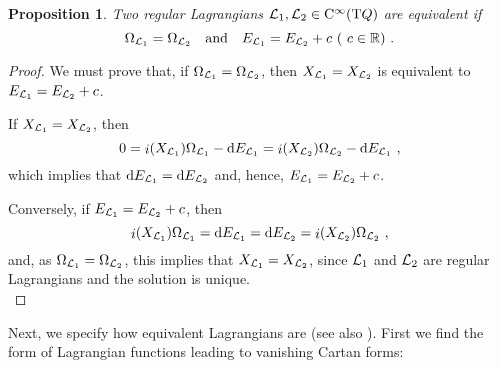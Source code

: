 \documentclass[12pt]{report}
\newtheorem{prop}[teor]{Proposition}
\def\qed{\ifvmode\removelastskip\fi
{\unskip\nobreak\hfil\penalty50\hbox{}\nobreak\hfil
\hbox{\vrule height1.2ex width1.2ex}\parfillskip=0pt
\finalhyphendemerits=0 \par\smallskip}}
\def\Lag{{\cal L}}
\def\d{{\rm d}}
\def\Real{\mathbb{R}}
\def\Tan{{\rm T}}
\def\inn{\mathop{i}\nolimits}
\def\Cinfty{{\rm C}^\infty}
\begin{document}
\begin{prop}
Two regular Lagrangians $\Lag_1,\Lag_2\in\Cinfty (\Tan Q)$
are equivalent if
$$
\Omega_{\Lag_1}=\Omega_{\Lag_2}
\quad {\rm and} \quad
 E_{\Lag_1}= E_{\Lag_2}+c \ \mbox{\rm( $c\in\Real$)} \ .
$$
\label{gaugecarac}
\end{prop}
\begin{proof}
We must prove that, if $\Omega_{\Lag_1}=\Omega_{\Lag_2}$,
then $X_{\Lag_1}= X_{\Lag_2}$ is equivalent to
$E_{\Lag_1}= E_{\Lag_2}+c$.

If $X_{\Lag_1}= X_{\Lag_2}$, then %
$$
0=\inn(X_{\Lag_1})\Omega_{\Lag_1}-\d E_{\Lag_1}=\inn(X_{\Lag_2})\Omega_{\Lag_2}-\d E_{\Lag_1} \ ,
$$
which implies that $\d E_{\Lag_1}= \d E_{\Lag_2}$ and, hence, $E_{\Lag_1}= E_{\Lag_2}+c$.

Conversely, if $E_{\Lag_1}= E_{\Lag_2}+c$, then
$$
\inn(X_{\Lag_1})\Omega_{\Lag_1}=\d E_{\Lag_1}=\d E_{\Lag_2}=\inn(X_{\Lag_2})\Omega_{\Lag_2} \ ,
$$
and, as $\Omega_{\Lag_1}=\Omega_{\Lag_2}$,
this implies that $X_{\Lag_1}= X_{\Lag_2}$, since
${\Lag_1}$ and ${\Lag_2}$ are regular Lagrangians and the solution is unique.
\\ \qed \end{proof}

Next, we specify how equivalent Lagrangians are (see also \cite{AM-78}).
First we find the form of Lagrangian functions leading to vanishing Cartan forms:
\end{document}
